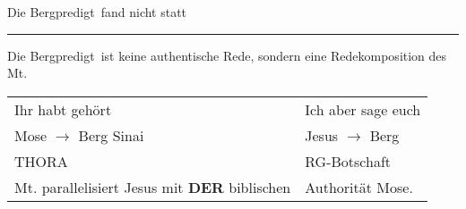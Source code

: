 \documentclass[12pt,a4paper,landscape]{report}
\newcommand{\bp}[0]{Bergpredigt\ }
\begin{document}
	\thispagestyle{empty}
	\noindent
	\Large
	Die \bp fand nicht statt
	\hrule
	\vspace{0.5cm}
	\large
	\noindent
	Die \bp ist keine authentische Rede, sondern eine Redekomposition des Mt. \\[1cm]
	\noindent
	\begin{tabularx}{0.75\linewidth}{XX}
		Ihr habt gehört & Ich aber sage euch \\
		Mose $\to$ Berg Sinai & Jesus $\to$ Berg \\
		\color{red} THORA & \color{red} RG-Botschaft \\
		\color{green}Mt. parallelisiert Jesus mit \textbf{DER} biblischen & \color{green}Authorität Mose.
	\end{tabularx}
\end{document}
